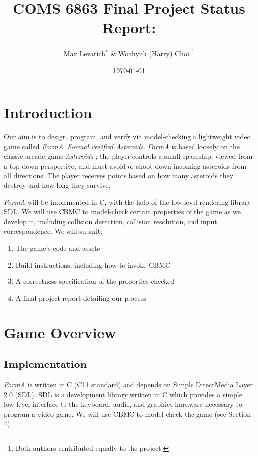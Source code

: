 \documentclass{article}
\title{COMS 6863 Final Project Status Report: \Name{}}
\author{
    Max Levatich$^*$ \& Wonhyuk (Harry) Choi
    \footnote{Both authors contributed equally to the project.}
}
\date{\today}
\newcommand{\Name}{\textit{FormA}\xspace}
\begin{document}
\maketitle

\section{Introduction}

    Our aim is to design, program, and verify via model-checking a lightweight
	video game called \Name, \emph{Formal verified Asteroids}.
	\Name is based loosely on the classic arcade
    game \textit{Asteroids} \cite{asteroids}; the player controls a small
    spaceship, viewed from a top-down perspective, and must avoid or shoot down
    incoming asteroids from all directions. The player receives points based on
    how many asteroids they destroy and how long they survive.

    \Name{} will be implemented in C, with the help of the low-level rendering
    library SDL. We will use CBMC \cite{clarke2004tool} to model-check
    certain properties of the game as we develop it, including collision
    detection, collision resolution, and input correspondence. We will submit:

    \begin{enumerate}
        \item{The game's code and assets}
        \item{Build instructions, including how to invoke CBMC}
        \item{A correctness specification of the properties checked}
        \item{A final project report detailing our process}
    \end{enumerate}

\section{Game Overview}

    \subsection{Implementation}

        \Name{} is written in C (C11 standard) and depends on Simple DirectMedia
        Layer 2.0 (SDL). SDL is a development library written in C which
        provides a simple low-level interface to the keyboard, audio, and
        graphics hardware necessary to program a video game. We will use CBMC
        to model-check the game (see Section 4).
\end{document}
